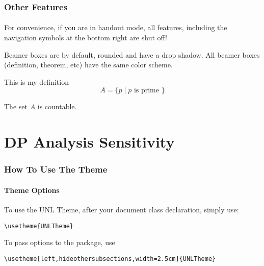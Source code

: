 \documentclass{beamer}
\begin{document}
\begin{frame}  %
    \frametitle{Other Features}
    \framesubtitle{}
    
    For convenience, if you are in handout mode, all features, including the
    navigation symbols at the bottom right are shut off!


    Beamer boxes are by default, rounded and have a drop shadow.  All beamer
    boxes (definition, theorem, etc) have the same color scheme.

    \begin{definition}
      This is my definition
      $$A = \{p \mid \textrm{$p$ is prime }\}$$
    \end{definition}
    
    \begin{theorem}
      The set $A$ is countable.
    \end{theorem}

\end{frame}

\section{DP Analysis Sensitivity}

\begin{frame}[fragile]
    \frametitle{How To Use The Theme}
    \framesubtitle{Theme Options}
    
    To use the UNL Theme, after your document class declaration, simply use:
    
    \begin{verbatim}\usetheme{UNLTheme}\end{verbatim}
    
    To pass options to the package, use
    
    \verb"\usetheme[left,hideothersubsections,width=2.5cm]{UNLTheme}"
    
\end{frame}
\end{document}
